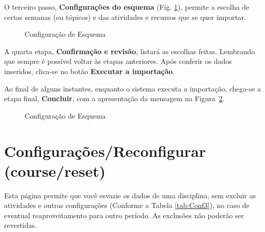 O terceiro passo, \textbf{Configurações do esquema} (Fig. \ref{Fig: cap3_22}), permite a escolha de certas semanas (ou tópicos) e das atividades e recursos que se quer importar.

\begin{figure}[htbp]
 \begin{center}
  \caption{Configuração de Esquema}
  \label{Fig: cap3_22}
 \end{center}
\end{figure}

A quarta etapa, \textbf{Confirmação e revisão}, listará as escolhas feitas. Lembrando que sempre é possível voltar às etapas anteriores. Após conferir os dados inseridos, clica-se no botão \textbf{Executar a importação}.

Ao final de alguns instantes, enquanto o sistema executa a importação, chega-se a etapa final, \textbf{Concluir}, com a apresentação da mensagem 
na Figura~\ref{Fig: cap3_23}.

\begin{figure}[htbp]
 \begin{center}
  \caption{Configuração de Esquema}
  \label{Fig: cap3_23}
 \end{center}
\end{figure}

\section{Configurações/Reconfigurar (course/reset)}
Esta página permite que você esvazie os dados de uma disciplina, sem excluir as atividades e outras configurações (Conforme a Tabela \ref{tab:Conf3}), no caso de eventual reaproveitamento para outro período. As exclusões não poderão ser revertidas.

